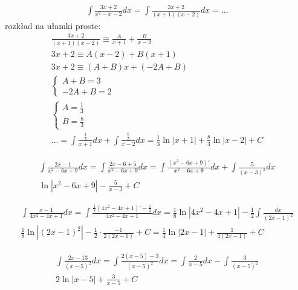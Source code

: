 
\begin{gather*}\int \frac{3x+2}{x^2-x-2}dx = \int \frac{3x+2}{(x+1)(x-2)}dx = \ldots\end{gather*}
rozkład na ułamki proste:
\begin{gather*}\frac{3x+2}{(x+1)(x-2)} \equiv \frac{A}{x+1}+\frac{B}{x-2} \\
3x+2 \equiv A(x-2)+B(x+1) \\
3x+2 \equiv (A+B)x+(-2A+B) \\
\begin{cases} A+B=3 \\ -2A+B=2 \end{cases} \\
\begin{cases} A=\frac{1}{3} \\ B=\frac{8}{3} \end{cases} \\
\ldots = \int \frac{\frac{1}{3}}{x+1}dx + \int \frac{\frac{8}{3}}{x-2}dx = \frac{1}{3}\ln|x+1|+\frac{8}{3}\ln|x-2|+C\end{gather*}



\begin{gather*}\int \frac{2x-1}{x^2-6x+9}dx = \int \frac{2x-6+5}{x^2-6x+9}dx = \int \frac{(x^2-6x+9)'}{x^2-6x+9}dx + \int \frac{5}{(x-3)^2}dx \\
 \ln|x^2-6x+9|-\frac{5}{x-3}+C\end{gather*}



\begin{gather*}\int \frac{x-1}{4x^2-4x+1}dx = \int \frac{\frac{1}{8}(4x^2-4x+1)'-\frac{1}{2}}{4x^2-4x+1}dx = \frac{1}{8}\ln|4x^2-4x+1|-\frac{1}{2}\int \frac{dx}{(2x-1)^2} \\
 \frac{1}{8}\ln|(2x-1)^2|-\frac{1}{2} \cdot \frac{-1}{2(2x-1)} + C = \frac{1}{4}\ln|2x-1|+\frac{1}{4(2x-1)}+C\end{gather*}



\begin{gather*}\int \frac{2x-13}{(x-5)^2}dx = \int \frac{2(x-5)-3}{(x-5)^2}dx = \int \frac{2}{x-5}dx-\int \frac{3}{(x-5)^2} \\
 2\ln|x-5|+\frac{3}{x-5}+C\end{gather*}



